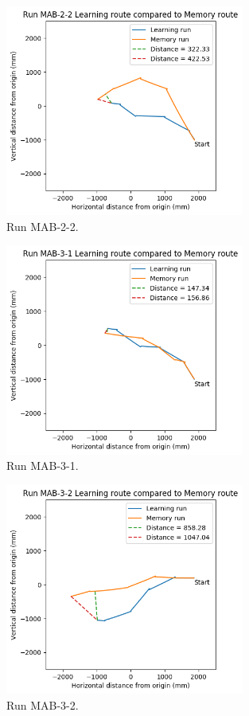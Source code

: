 \documentclass[a4paper,11pt,twoside,openright]{article}
\begin{document}
\begin{figure}[h!]
 \centering
  \includegraphics[width=0.7\textwidth]{MAB-2-2}
  \caption{
    \label{fig:mab-2-2} Run MAB-2-2.
  }
\end{figure}

\begin{figure}[h!]
 \centering
  \includegraphics[width=0.7\textwidth]{MAB-3-1}
  \caption{
    \label{fig:mab-3-1} Run MAB-3-1.
  }
\end{figure}

\begin{figure}[h!]
 \centering
  \includegraphics[width=0.7\textwidth]{MAB-3-2}
  \caption{
    \label{fig:mab-3-2} Run MAB-3-2.
  }
\end{figure}
\end{document}
